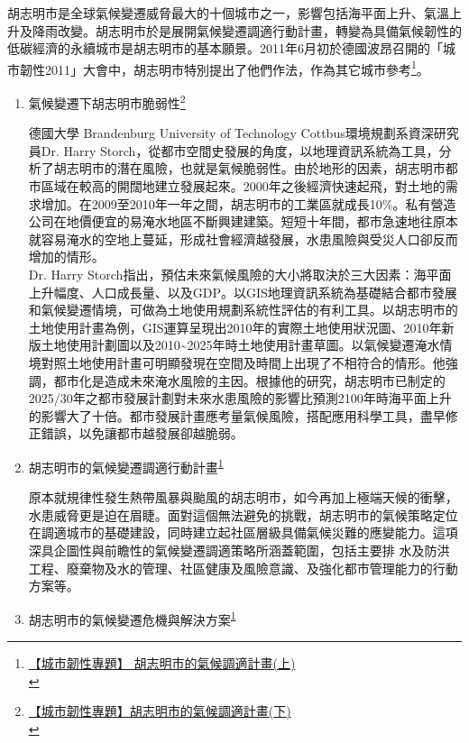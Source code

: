 \documentclass[a4paper,12pt]{article}
\begin{document}
\begin{enumerate}
胡志明市是全球氣候變遷威脅最大的十個城市之一，影響包括海平面上升、氣溫上升及降雨改變。胡志明市於是展開氣候變遷調適行動計畫，轉變為具備氣候韌性的低碳經濟的永續城市是胡志明市的基本願景。2011年6月初於德國波昂召開的「城市韌性2011」大會中，胡志明市特別提出了他們作法，作為其它城市參考\footnote{\href{https://e-info.org.tw/node/68861}{【城市韌性專題】 胡志明市的氣候調適計畫(上)}\\\label{org4b931b3}}。\\
\begin{enumerate}
\item 氣候變遷下胡志明市脆弱性\footnote{\href{https://e-info.org.tw/node/68862}{【城市韌性專題】胡志明市的氣候調適計畫(下)}\\\label{orgdbe6c89}}
\label{sec:org0ca4a31}

德國大學 Brandenburg University of Technology Cottbus環境規劃系資深研究員Dr. Harry Storch，從都市空間史發展的角度，以地理資訊系統為工具，分析了胡志明市的潛在風險，也就是氣候脆弱性。由於地形的因素，胡志明市都市區域在較高的開闊地建立發展起來。2000年之後經濟快速起飛，對土地的需求增加。在2009至2010年一年之間，胡志明市的工業區就成長10\%。私有營造公司在地價便宜的易淹水地區不斷興建建築。短短十年間，都市急速地往原本就容易淹水的空地上蔓延，形成社會經濟越發展，水患風險與受災人口卻反而增加的情形。\\

Dr. Harry Storch指出，預估未來氣候風險的大小將取決於三大因素：海平面上升幅度、人口成長量、以及GDP。以GIS地理資訊系統為基礎結合都市發展和氣候變遷情境，可做為土地使用規劃系統性評估的有利工具。以胡志明市的土地使用計畫為例，GIS運算呈現出2010年的實際土地使用狀況圖、2010年新版土地使用計劃圖以及2010\textasciitilde{}2025年時土地使用計畫草圖。以氣候變遷淹水情境對照土地使用計畫可明顯發現在空間及時間上出現了不相符合的情形。他強調，都市化是造成未來淹水風險的主因。根據他的研究，胡志明市已制定的2025/30年之都市發展計劃對未來水患風險的影響比預測2100年時海平面上升的影響大了十倍。都市發展計畫應考量氣候風險，搭配應用科學工具，盡早修正錯誤，以免讓都市越發展卻越脆弱。\\
\item 胡志明市的氣候變遷調適行動計畫\textsuperscript{\ref{org4b931b3}}
\label{sec:orgd7ea558}

原本就規律性發生熱帶風暴與颱風的胡志明市，如今再加上極端天候的衝擊，水患威脅更是迫在眉睫。面對這個無法避免的挑戰，胡志明市的氣候策略定位在調適城市的基礎建設，同時建立起社區層級具備氣候災難的應變能力。這項深具企圖性與前瞻性的氣候變遷調適策略所涵蓋範圍，包括主要排 水及防洪工程、廢棄物及水的管理、社區健康及風險意識、及強化都市管理能力的行動方案等。\\
\item 胡志明市的氣候變遷危機與解決方案\textsuperscript{\ref{org4b931b3}}
\label{sec:org45f8645}


\end{enumerate}
\end{enumerate}
\end{document}
